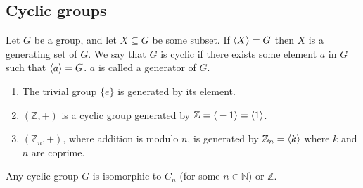 \subsection{Cyclic groups}
\begin{definition}
	Let \(G\) be a group, and let \(X \subseteq G\) be some subset.
	If \(\left\langle{} X \right\rangle = G\) then \(X\) is a generating set of \(G\).
	We say that \(G\) is cyclic if there exists some element \(a\) in \(G\) such that \(\left\langle{} a \right\rangle = G\).
	\(a\) is called a generator of \(G\).
\end{definition}
\begin{enumerate}
	\item The trivial group \(\{ e \}\) is generated by its element.
	\item \((\mathbb Z, +)\) is a cyclic group generated by \(\mathbb Z = \left\langle{} -1 \right\rangle = \left\langle{} 1 \right\rangle\).
	\item \((\mathbb Z_n, +)\), where addition is modulo \(n\), is generated by \(\mathbb Z_n = \left\langle{} k \right\rangle\) where \(k\) and \(n\) are coprime.
\end{enumerate}
\begin{theorem}
	Any cyclic group \(G\) is isomorphic to \(C_n\) (for some \(n \in \mathbb N\)) or \(\mathbb Z\).
\end{theorem}
